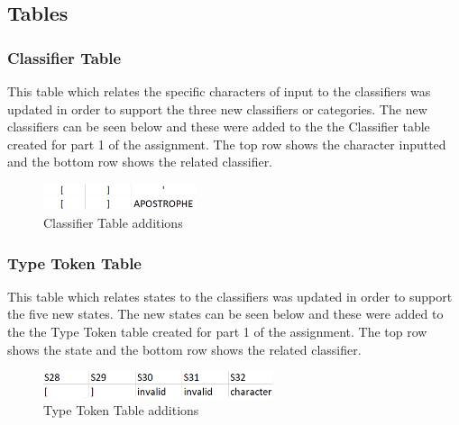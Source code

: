 \documentclass{article}
\begin{document}
			\subsection{Tables}
			\subsubsection{Classifier Table}
			
			This table which relates the specific characters of input to the classifiers was updated in order to support the three new classifiers or categories. The new classifiers can be seen below and these were added to the the Classifier table created for part 1 of the assignment. The top row shows the character inputted and the bottom row shows the related classifier.
			
			 \begin{center}
					\begin{figure}[H]
			 			\includegraphics[width=0.4\textwidth]{ctpart2.png}
			 			\centering
			  			\caption{Classifier Table additions}
			  			\label{fig:cttable}
					\end{figure}
				\end{center}
				
				\subsubsection{Type Token Table}
			
			This table which relates states to the classifiers was updated in order to support the five new states. The new states can be seen below and these were added to the the Type Token table created for part 1 of the assignment. The top row shows the state and the bottom row shows the related classifier.
			
			 \begin{center}
					\begin{figure}[H]
			 			\includegraphics[width=0.6\textwidth]{ttpart2.png}
			 			\centering
			  			\caption{Type Token Table additions}
			  			\label{fig:tttable}
					\end{figure}
				\end{center}
				
\end{document}
